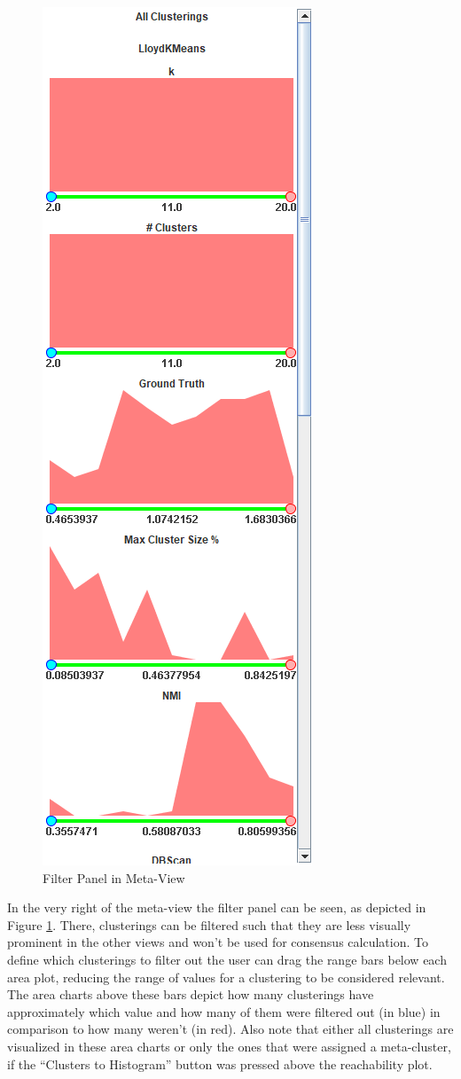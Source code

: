 \documentclass[
	a4paper,
	english,
	twoside,
	openright,               
	11pt                            
	]{report}
\begin{document}
\begin{figure}[h]
	\centering
	\includegraphics[scale=.5]{filter-panel}
	\caption{Filter Panel in Meta-View}
	\label{fig:filterpanel}
\end{figure}

In the very right of the meta-view the filter panel can be seen, as depicted in Figure \ref{fig:filterpanel}. There, clusterings can be filtered such that they are less visually prominent in the other views and won't be used for consensus calculation. To define which clusterings to filter out the user can drag the range bars below each area plot, reducing the range of values for a clustering to be considered relevant. The area charts above these bars depict how many clusterings have approximately which value and how many of them were filtered out (in blue) in comparison to how many weren't (in red). Also note that either all clusterings are visualized in these area charts or only the ones that were assigned a meta-cluster, if the ``Clusters to Histogram'' button was pressed above the reachability plot.
\end{document}

